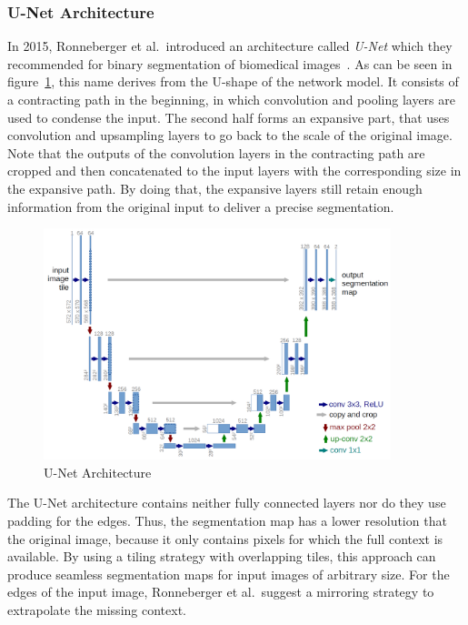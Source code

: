 \subsubsection{U-Net Architecture}
\label{sec:unet}
In 2015, Ronneberger et al.\ introduced an architecture called \emph{U-Net} which they recommended for binary segmentation of biomedical images~\cite{unet15}. As can be seen in figure~\ref{fig:unet_architecture}, this name derives from the U-shape of the network model. It consists of a contracting path in the beginning, in which convolution and pooling layers are used to condense the input. The second half forms an expansive part, that uses convolution and upsampling layers to go back to the scale of the original image. Note that the outputs of the convolution layers in the contracting path are cropped and then concatenated to the input layers with the corresponding size in the expansive path. By doing that, the expansive layers still retain enough information from the original input to deliver a precise segmentation.

\begin{figure}[h]
    \centering
    \includegraphics[width=0.9\textwidth]{images/u-net-architecture}
    \caption{U-Net Architecture \cite{unet15}}
    \label{fig:unet_architecture}
\end{figure}

The U-Net architecture contains neither fully connected layers nor do they use padding for the edges. Thus, the segmentation map has a lower resolution that the original image, because it only contains pixels for which the full context is available. By using a tiling strategy with overlapping tiles, this approach can produce seamless segmentation maps for input images of arbitrary size. For the edges of the input image, Ronneberger et al.\ suggest a mirroring strategy to extrapolate the missing context.~\cite{unet15}

